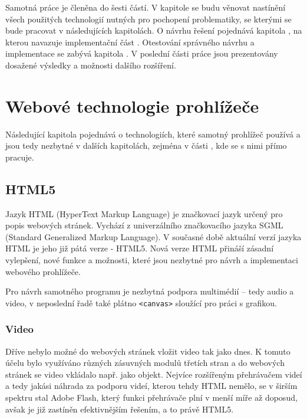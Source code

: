 Samotná práce je členěna do šesti částí. V kapitole  se budu věnovat nastínění všech použitých technologií nutných pro pochopení problematiky, se kterými se bude pracovat v následujících kapitolách. O návrhu řešení pojednává kapitola , na kterou navazuje implementační část . Otestování správného návrhu a implementace se zabývá kapitola  . V poslední části práce  jsou prezentovány dosažené výsledky a možnosti dalšího rozšíření.




\chapter{Webové technologie prohlížeče}
\label{chapter:2}
Následující kapitola pojednává o technologiích, které samotný prohlížeč používá a jsou tedy nezbytné v dalších kapitolách, zejména v části , kde se s nimi přímo pracuje.


\section{HTML5}

Jazyk HTML (HyperText Markup Language) je značkovací jazyk určený pro popis webových stránek. Vychází z univerzálního značkovacího jazyka SGML (Standard Generalized Markup Language). V současné době aktuální verzí  jazyka HTML je jeho již pátá verze -  HTML5. Nová verze HTML přináší zásadní vylepšení, nové funkce a možnosti, které jsou nezbytné pro návrh a implementaci webového prohlížeče. 

Pro návrh samotného programu je nezbytná podpora multimédií – tedy audio a video, v neposlední řadě také plátno \texttt{<canvas>} sloužící pro práci s grafikou.



\subsection{Video}
Dříve nebylo možné do webových stránek vložit video tak jako dnes. K tomuto účelu bylo využíváno různých zásuvných modulů třetích stran a do webových stránek se video vkládalo např. jako objekt. \cite{HTML5_CZNIC} Nejvíce rozšířeným přehrávačem videí a tedy jakási náhrada za podporu videí, kterou tehdy HTML nemělo, se v širším spektru stal Adobe Flash, který funkci přehrávače plní v menší míře až doposud, avšak je již zastíněn efektivnějším řešením, a to právě HTML5. \cite{HTML5aCSS3}

